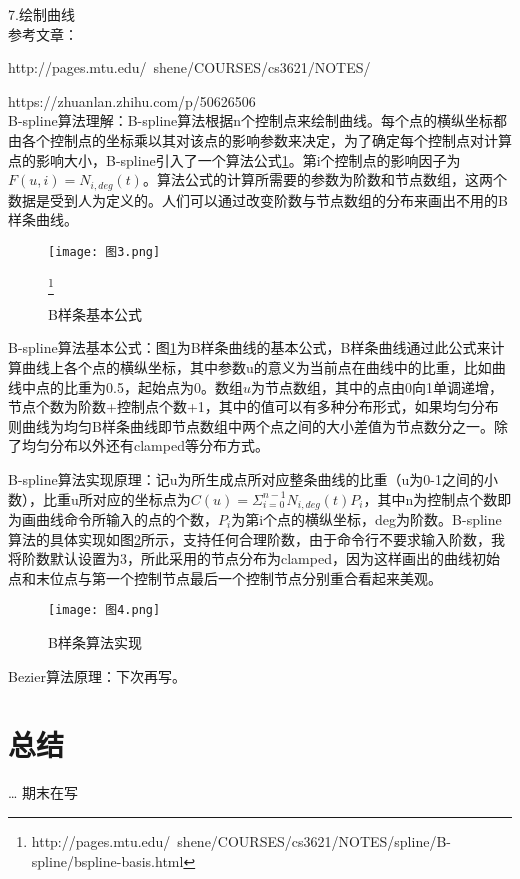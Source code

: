 \documentclass[a4paper,UTF8]{article}
\theoremstyle{definition}
\begin{document}
\noindent{}7.绘制曲线\\

\indent{}参考文章：

http://pages.mtu.edu/~shene/COURSES/cs3621/NOTES/

https://zhuanlan.zhihu.com/p/50626506\\


\indent{}B-spline算法理解：B-spline算法根据n个控制点来绘制曲线。每个点的横纵坐标都由各个控制点的坐标乘以其对该点的影响参数来决定，为了确定每个控制点对计算点的影响大小，B-spline引入了一个算法公式\ref{fig:图3}。第i个控制点的影响因子为$F(u,i)=N_{i,deg}(t)$。算法公式的计算所需要的参数为阶数和节点数组，这两个数据是受到人为定义的。人们可以通过改变阶数与节点数组的分布来画出不用的B样条曲线。

\begin{figure}[htbp]
   \centering
   \texttt{[image: 图3.png]} %
   \caption{B样条基本公式}\footnote{http://pages.mtu.edu/~shene/COURSES/cs3621/NOTES/spline/B-spline/bspline-basis.html}
   \label{fig:图3}
\end{figure}

\indent{}B-spline算法基本公式：图\ref{fig:图3}为B样条曲线的基本公式，B样条曲线通过此公式来计算曲线上各个点的横纵坐标，其中参数u的意义为当前点在曲线中的比重，比如曲线中点的比重为0.5，起始点为0。数组$u$为节点数组，其中的点由0向1单调递增，节点个数为阶数+控制点个数+1，其中的值可以有多种分布形式，如果均匀分布则曲线为均匀B样条曲线即节点数组中两个点之间的大小差值为节点数分之一。除了均匀分布以外还有clamped等分布方式。

\indent{}B-spline算法实现原理：记u为所生成点所对应整条曲线的比重（u为0-1之间的小数），比重u所对应的坐标点为$C(u)=\Sigma_{i=0}^{n-1}N_{i,deg}(t)P_i$，其中n为控制点个数即为画曲线命令所输入的点的个数，$P_i$为第i个点的横纵坐标，deg为阶数。B-spline算法的具体实现如图\ref{fig:图4}所示，支持任何合理阶数，由于命令行不要求输入阶数，我将阶数默认设置为3，所此采用的节点分布为clamped，因为这样画出的曲线初始点和末位点与第一个控制节点最后一个控制节点分别重合看起来美观。

\begin{figure}[htbp]
   \centering
   \texttt{[image: 图4.png]} %
   \caption{B样条算法实现}
   \label{fig:图4}
\end{figure}

\indent{}Bezier算法原理：下次再写。

\section{总结}
\dots
期末在写

%

\end{document}
